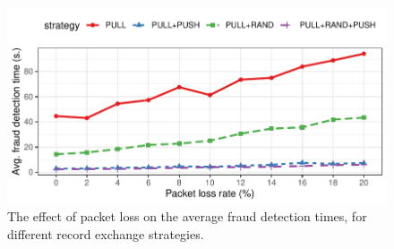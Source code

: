 

\begin{figure}[t]
	\centering
	\includegraphics[width=.8\linewidth]{trustchain/assets/fraud_times_send_failure}
	\caption{The effect of packet loss on the average fraud detection times, for different record exchange strategies.}
	\label{fig:fraud_times_link_failures}
\end{figure}

